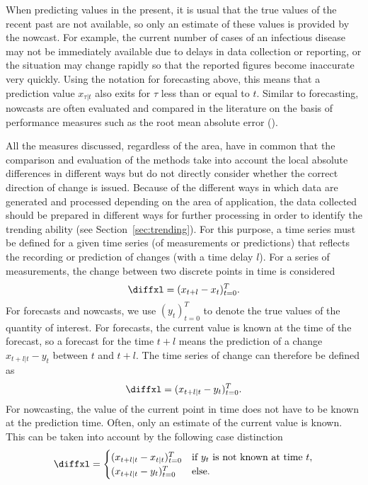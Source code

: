 When predicting values in the present, it is usual that the true values of the recent past are not available, so only an estimate of these values is provided by the nowcast. For example, the current number of cases of an infectious disease may not be immediately available due to delays in data collection or reporting, or the situation may change rapidly so that the reported figures become inaccurate very quickly.
Using the notation for forecasting above, this means that a prediction value $x_{\tau|t}$ also exits for $\tau$ less than or equal to $t$.
Similar to forecasting, nowcasts are often evaluated and compared in the literature on the basis of performance measures such as the root mean absolute error (\cite{gunther2021nowcasting}).

All the measures discussed, regardless of the area, have in common that the comparison and evaluation of the methods take into account the local absolute differences in different ways but do not directly consider whether the correct direction of change is issued.
Because of the different ways in which data are generated and processed depending on the area of application, the data collected should be prepared in different ways for further processing in order to identify the trending ability (see Section~\ref{sec:trending}). For this purpose, a time series must be defined for a given time series (of measurements or predictions) that reflects the recording or prediction of changes (with a time delay $l$). For a series of measurements, the change between two discrete points in time is considered
\begin{equation}
    \diffxl = (x_{t+l} -x_{t})^T_{t=0}. \label{eq:diffxl_measure_old}
\end{equation}
For forecasts and nowcasts, we use $(y_t)^T_{t=0}$ to denote the true values of the quantity of interest. For forecasts, the current value is known at the time of the forecast, so a forecast for the time $t+l$ means the prediction of a change $x_{t+l|t} -y_{t}$ between $t$ and $t+l$. The time series of change can therefore be defined as 
\begin{equation}
    \diffxl = (x_{t+l|t} -y_{t})^T_{t=0}.\label{eq:diffxl_forecasting_old}
\end{equation}
For nowcasting, the value of the current point in time does not have to be known at the prediction time. Often, only an estimate of the current value is known. This can be taken into account by the following case distinction
\begin{equation}
\diffxl = 
\begin{cases} 
(x_{t+l|t} -x_{t|t})^T_{t=0} & \text{if } y_{t} \text{ is not known at time } t, \\
(x_{t+l|t} -y_{t})^T_{t=0}  & \text{else}.
\end{cases} \label{eq:diffxl_nowcasting_old}
\end{equation}



